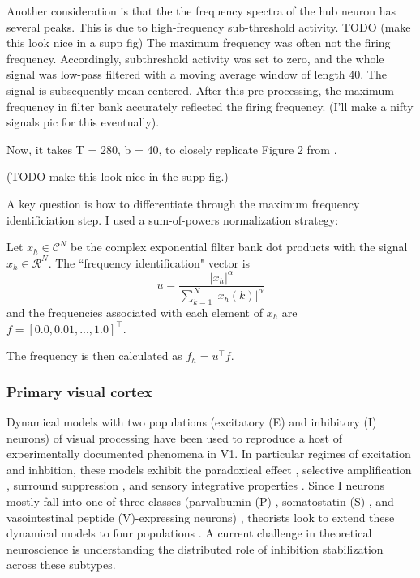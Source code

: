 \documentclass[11pt]{article}
\begin{document}
Another consideration is that the the frequency spectra of the hub neuron has several peaks.  This is due to high-frequency sub-threshold activity.
TODO (make this look nice in a supp fig)
The maximum frequency was often not the firing frequency.  Accordingly, subthreshold activity was set to zero, and the whole signal was low-pass filtered with a moving average window of length 40.  The signal is subsequently mean centered.  After this pre-processing, the maximum frequency in filter bank accurately reflected the firing frequency. (I'll make a nifty signals pic for this eventually).

Now, it takes T = 280, b = 40, to closely replicate Figure 2 from \cite{gutierrez2013multiple}.

(TODO make this look nice in the supp fig.)

A key question is how to differentiate through the maximum frequency identificiation step.  I used a sum-of-powers normalization strategy:

Let $x_h \in \mathcal{C}^N$ be the complex exponential filter bank dot products with the signal $x_h \in \mathcal{R}^N$.  The ``frequency identification" vector is 
\[u = \frac{|x_h|^\alpha}{\sum_{k=1}^N |x_h(k)|^\alpha} \] and the frequencies associated with each element of $x_h$ are $f = \left[ 0.0, 0.01, ..., 1.0 \right]^\top$.

The frequency is then calculated as $f_h = u^\top f$.

\subsubsection{Primary visual cortex}
Dynamical models with two populations (excitatory (E) and inhibitory (I) neurons) of visual processing have been used to reproduce a host of experimentally documented phenomena in V1.  In particular regimes of excitation and inhbition, these models exhibit the paradoxical effect \cite{tsodyks1997paradoxical}, selective amplification \cite{murphy2009balanced}, surround suppression \cite{ozeki2009inhibitory}, and  sensory integrative properties \cite{rubin2015stabilized}.  Since I neurons mostly fall into one of three classes (parvalbumin (P)-, somatostatin (S)-, and vasointestinal peptide (V)-expressing neurons) \cite{markram2004interneurons, rudy2011three}, theorists look to extend these dynamical models to four populations \cite{litwin2016inhibitory}.  A current challenge in theoretical neuroscience is understanding the distributed role of inhibition stabilization across these subtypes.  
\end{document}
